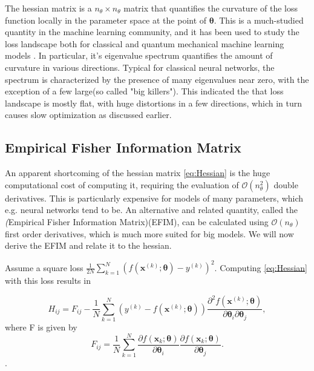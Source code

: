 The hessian matrix is a $n_\theta \times n_\theta$ matrix that quantifies the curvature of the loss function locally in the parameter space at the point of $\boldsymbol{\theta}$. This is a much-studied quantity in the machine learning community, and it has been used to study the loss landscape both for classical and quantum mechanical machine learning models \cite{LeCun2012} \cite{Huembeli_2021}. In particular, it's eigenvalue spectrum quantifies the amount of curvature in various directions. Typical for classical neural networks, the spectrum is characterized by the presence of many eigenvalues near zero, with the exception of a few large(so called "big killers"). This indicated the that loss landscape is mostly flat, with huge distortions in a few directions, which in turn causes slow optimization as discussed earlier. 

\subsection{Empirical Fisher Information Matrix}\label{sec:EFIM}
An apparent shortcoming of the hessian matrix \autoref{eq:Hessian} is the huge computational cost of computing it, requiring the evaluation of $\mathcal{O}(n_\theta^2)$ double derivatives. This is particularly expensive for models of many parameters, which e.g. neural networks tend to be. An alternative and related quantity, called the \emph(Empirical Fisher Information Matrix)(EFIM), can be calculated using $\mathcal{O}(n_\theta)$ first order derivatives, which is much more suited for big models. We will now derive the EFIM and relate it to the hessian.

Assume a square loss $\frac{1}{2N}\sum_{k=1}^{N} (f(\boldsymbol{x}^{(k)}; \boldsymbol{\theta}) - y^{(k)})^2$. Computing \autoref{eq:Hessian} with this loss results in 
    
\begin{equation}\label{eq:HessianSquareLoss}
    H_{ij} = F_{ij} -
    \frac{1}{N}\sum_{k=1}^{N} (y^{(k)} - f(\boldsymbol{x}^{(k)};\boldsymbol{\theta}))\frac{\partial^2 f(\boldsymbol{x}^{(k)};\boldsymbol{\theta})}{\partial \boldsymbol{\theta}_i\partial \boldsymbol{\theta}_j}, 
\end{equation}
where F is given by
\begin{equation}
\label{eq:EmpiricalFisher}
    F_{ij} =  \frac{1}{N}\sum_{k=1}^{N}
    \frac{\partial f(\boldsymbol{x}_k;\boldsymbol{\theta})}{\partial \boldsymbol{\theta}_i}
    \frac{\partial f(\boldsymbol{x}_k;\boldsymbol{\theta})}{\partial \boldsymbol{\theta}_j}.
\end{equation}.

